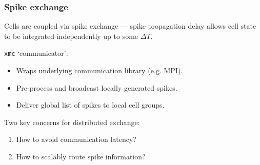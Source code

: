 \documentclass[aspectratio=43,12pt]{beamer}
\newcommand{\xmc}{\texttt{xmc}\xspace}
\begin{document}
\begin{frame}
\frametitle{Spike exchange}

\vfill
Cells are coupled via spike exchange --- spike propagation delay allows
cell state to be integrated independently up to some $\Delta T$.
\vfill

\xmc{} `communicator':
\begin{itemize}
\item Wraps underlying communication library (e.g. MPI).
\item Pre-process and broadcast locally generated spikes.
\item Deliver global list of spikes to local cell groups.
\end{itemize}
\vfill

Two key concerns for distributed exchange:
\begin{enumerate}
\pause
\item How to avoid communication latency?
\pause
\item How to scalably route spike information?
\end{enumerate}
\vfill
\end{frame}
\end{document}
